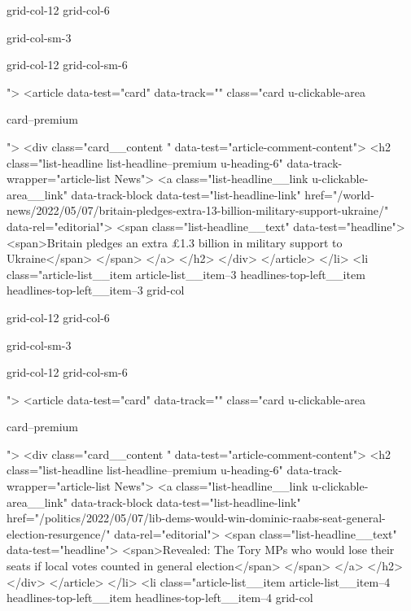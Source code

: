 {{{			
			
			grid-col-12
			grid-col-6
			
			
			
			
			
			grid-col-sm-3
			
			
			
			grid-col-12 grid-col-sm-6
			
			
			
			
			">
<article data-test="card" data-track="" class="card
			u-clickable-area
			
			
			card--premium
			
			
			
			
			
			 ">
<div class="card__content " data-test="article-comment-content">
<h2 class="list-headline list-headline--premium u-heading-6" data-track-wrapper="article-list News">
<a class="list-headline__link u-clickable-area__link" data-track-block data-test="list-headline-link" href="/world-news/2022/05/07/britain-pledges-extra-13-billion-military-support-ukraine/" data-rel="editorial">
<span class="list-headline__text" data-test="headline">
<span>Britain pledges an extra £1.3 billion in military support to Ukraine</span>
</span>
</a>
</h2>
</div>
</article>
</li>
<li class="article-list__item article-list__item--3 headlines-top-left__item headlines-top-left__item--3
			grid-col
			
			
			
			grid-col-12
			grid-col-6
			
			
			
			
			
			grid-col-sm-3
			
			
			
			grid-col-12 grid-col-sm-6
			
			
			
			
			">
<article data-test="card" data-track="" class="card
			u-clickable-area
			
			
			card--premium
			
			
			
			
			
			 ">
<div class="card__content " data-test="article-comment-content">
<h2 class="list-headline list-headline--premium u-heading-6" data-track-wrapper="article-list News">
<a class="list-headline__link u-clickable-area__link" data-track-block data-test="list-headline-link" href="/politics/2022/05/07/lib-dems-would-win-dominic-raabs-seat-general-election-resurgence/" data-rel="editorial">
<span class="list-headline__text" data-test="headline">
<span>Revealed: The Tory MPs who would lose their seats if local votes counted in general election</span>
</span>
</a>
</h2>
</div>
</article>
</li>
<li class="article-list__item article-list__item--4 headlines-top-left__item headlines-top-left__item--4
			grid-col
			
}}}
